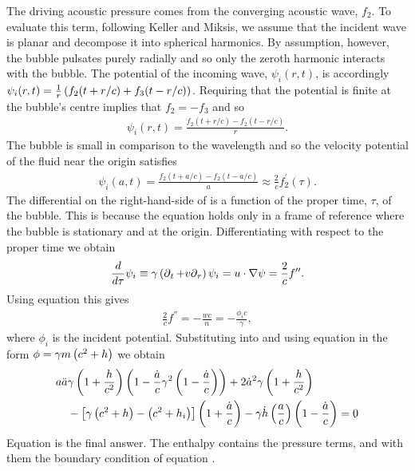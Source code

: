 The driving acoustic pressure comes from the converging acoustic wave, $f_2$.
To evaluate this term, following Keller and Miksis, 
we assume that the incident wave is planar and decompose it into  spherical harmonics.
By assumption, however, the bubble pulsates purely radially and so only the zeroth harmonic interacts with the bubble.
The potential of the incoming wave, $\psi_i (r,t)$, is accordingly 
  $\psi_i (r,t) = \frac{1}{r}\left( f_2(t+r/c) + f_3(t-r/c) \right)$.
Requiring that the potential is finite at the bubble's centre implies that  $f_2 = -f_3$ and so
\begin{align}
  \psi_i (r,t) = \frac{f_2(t+r/c) - f_2(t-r/c)}{r}.
\end{align}
The bubble is small in comparison to the wavelength and so the velocity potential of the fluid near the origin satisfies
\begin{align}
  \label{eqn:Tau}
 \psi_i (a,t) = \frac{f_2(t+a/c) - f_2(t-a/c)}{a} \approx \frac{2}{c}f_2^\prime(\tau).
\end{align}
The differential on the right-hand-side of  is a function of the proper time, $\tau$, of the bubble.
This is because the equation holds only in a frame of reference where the bubble is stationary and at the origin.
Differentiating  with respect to the proper time we obtain
\begin{align}
  \frac{d}{d \tau} \psi_i \equiv \gamma \left( \operatorname{\partial}_t+ v{\operatorname{\partial}_r}  \right) \psi_i = u \cdot \nabla \psi = \frac{2}{c}f^{\prime\prime}.
\end{align}
Using equation   this gives
\begin{align}
\frac{2}{c}f^\dprime =-\frac{wc}{n}= - \frac{\phi_i c}{\gamma}, \label{eqn:IncidentWave}
\end{align}
where $\phi_i$ is the incident  potential.
Substituting   into  and using equation  in the form $\phi = \gamma m\left( c^2 + h \right)$ we obtain
\begin{align}
  a \ddot a & \gamma \left( 1 + \frac{h}{c^2} \right)\left( 1 - \frac{\dot a}{c}\gamma^2\left( 1- \frac{\dot a}{c} \right) \right)+ 2 {\dot a}^2\gamma\left( 1 + \frac{h}{c^2} \right)\nonumber\\
  &- \left[ \gamma\left( c^2 + h \right) - \left( c^2 + h_i \right) \right]\left( 1 + \frac{\dot a}{c} \right)- \gamma \dot h \left( \frac{a}{c} \right)\left( 1 - \frac{\dot a}{c} \right)
= 0\label{eqn:RKM}
\end{align}
Equation  is the final answer. The enthalpy contains the pressure terms, and with them the boundary condition of equation .

